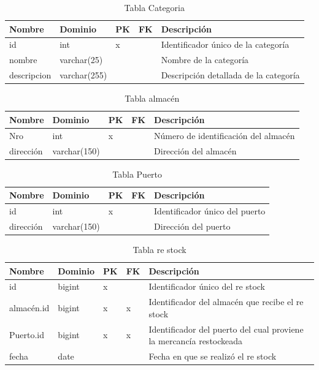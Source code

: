 \documentclass[10pt, a4paper,openany]{report}
\begin{document}
\begin{table}[h]
\centering
\begin{tabular}{|l|p{2cm}|p{0.5cm}|p{0.5cm}|p{3cm}|}
\hline
\textbf{Nombre} & \textbf{Dominio} & \textbf{PK} & \textbf{FK} & \textbf{Descripción} \\
\hline
id & int & x & & Identificador único de la categoría \\
\hline
nombre & varchar(25) & & & Nombre de la categoría \\
\hline
descripcion & varchar(255) & & & Descripción detallada de la categoría \\
\hline
\end{tabular}
\caption{Tabla Categoria}
\end{table}

\begin{table}[h]
\centering
\begin{tabular}{|l|p{2cm}|p{0.5cm}|p{0.5cm}|p{3cm}|}
\hline
\textbf{Nombre} & \textbf{Dominio} & \textbf{PK} & \textbf{FK} & \textbf{Descripción} \\
\hline
Nro & int & x & & Número de identificación del almacén \\
\hline
dirección & varchar(150) & & & Dirección del almacén \\
\hline
\end{tabular}
\caption{Tabla almacén}
\end{table}

\begin{table}[h]
\centering
\begin{tabular}{|l|p{2cm}|p{0.5cm}|p{0.5cm}|p{3cm}|}
\hline
\textbf{Nombre} & \textbf{Dominio} & \textbf{PK} & \textbf{FK} & \textbf{Descripción} \\
\hline
id & int & x & & Identificador único del puerto \\
\hline
dirección & varchar(150) & & & Dirección del puerto \\
\hline
\end{tabular}
\caption{Tabla Puerto}
\end{table}

\begin{table}[h]
\centering
\begin{tabular}{|l|p{1.5cm}|p{0.5cm}|p{0.5cm}|p{3cm}|}
\hline
\textbf{Nombre} &
\textbf{Dominio} &
\textbf{PK} &
\textbf{FK} &
\textbf{Descripción} \\
\hline
id & bigint & x & & Identificador único del re stock \\
\hline
almacén.id & bigint & x& x & Identificador del almacén que recibe el re stock \\
\hline
Puerto.id & bigint & x& x & Identificador del puerto del cual proviene la mercancía restockeada \\
\hline
fecha & date & & & Fecha en que se realizó el re stock \\
\hline
\end{tabular}
\caption{Tabla re stock}
\end{table}
\end{document}
